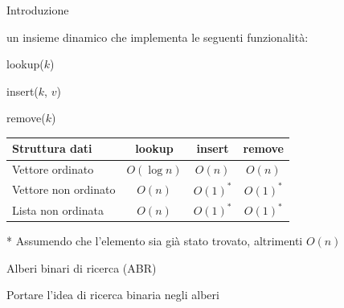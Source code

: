 \begin{frame}{Introduzione}

\vspace{-9pt}
\begin{myboxtitle}[Dizionario]
\EE un insieme dinamico che implementa le seguenti funzionalità:
\BIL
\item \Item \textsf{lookup}(\Item $k$)
\item \textsf{insert}(\Item $k$, \Item $v$)
\item \textsf{remove}(\Item $k$)
\EIL
\end{myboxtitle}

\begin{myboxtitle}

\begin{tabular}{|l|c|c|c|}
\hline
Struttura dati & \textsf{lookup} & \textsf{insert} & \textsf{remove} \\\hline
Vettore ordinato &  $O(\log n)$ & $O(n)$ & $O(n)$ \\\hline
Vettore non ordinato &  $O(n)$ & $O(1)^*$ & $O(1)^*$ \\\hline
Lista non ordinata &  $O(n)$ & $O(1)^*$ & $O(1)^*$ \\\hline
\end{tabular}

\footnotesize
* Assumendo che l'elemento sia già stato trovato, altrimenti $O(n)$
\end{myboxtitle}

\end{frame}


\begin{frame}{Alberi binari di ricerca (ABR)}


\vspace{-9pt}
\begin{myboxtitle}
Portare l'idea di ricerca binaria negli alberi
\end{myboxtitle}

\end{frame}


